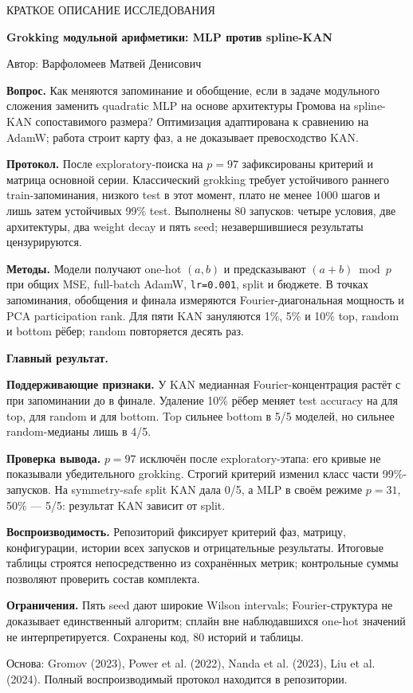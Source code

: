 \documentclass[11pt,a4paper]{article}
\begin{document}
{\color{accent}\small КРАТКОЕ ОПИСАНИЕ ИССЛЕДОВАНИЯ}\par
{\LARGE\bfseries Grokking модульной арифметики: MLP против spline-KAN}\par
{\small Автор: Варфоломеев Матвей Денисович}\par
\vspace{3mm}

\textbf{Вопрос.} Как меняются запоминание и обобщение, если в задаче модульного
сложения заменить quadratic MLP на основе архитектуры Громова на spline-KAN
сопоставимого размера? Оптимизация адаптирована к сравнению на AdamW; работа
строит карту фаз, а не доказывает превосходство KAN.

\textbf{Протокол.} После exploratory-поиска на $p=97$ зафиксированы критерий и
матрица основной серии. Классический grokking требует устойчивого раннего
train-запоминания, низкого test в этот момент, плато не менее 1000 шагов и лишь
затем устойчивых 99\% test. Выполнены 80 запусков: четыре условия,
две архитектуры, два weight decay и пять seed; незавершившиеся результаты
цензурируются.

\textbf{Методы.} Модели получают one-hot $(a,b)$ и предсказывают
$(a+b)\bmod p$ при общих MSE, full-batch AdamW, \texttt{lr=0.001}, split и
бюджете. В точках запоминания, обобщения и финала измеряются
Fourier-диагональная мощность и PCA participation rank. Для пяти KAN зануляются
1\%, 5\% и 10\% top, random и bottom рёбер; random повторяется десять раз.

\textbf{Главный результат.} \MainResultLong

\textbf{Поддерживающие признаки.} У KAN медианная Fourier-концентрация растёт с
\KanFourierMem{} при запоминании до \KanFourierFinal{} в финале. Удаление 10\%
рёбер меняет test accuracy на \TopTenDelta{} для top, \RandomTenDelta{} для
random и \BottomTenDelta{} для bottom. Top сильнее bottom в 5/5 моделей, но
сильнее random-медианы лишь в 4/5.

\textbf{Проверка вывода.} $p=97$ исключён после exploratory-этапа: его
кривые не показывали убедительного grokking. Строгий критерий изменил класс
части 99\%-запусков. На symmetry-safe split KAN дала 0/5, а MLP в своём
режиме $p=31$, 50\% --- 5/5: результат KAN зависит от split.

\textbf{Воспроизводимость.} Репозиторий фиксирует критерий фаз, матрицу,
конфигурации, истории всех запусков и отрицательные результаты. Итоговые таблицы
строятся непосредственно из сохранённых метрик; контрольные суммы позволяют
проверить состав комплекта.

\textbf{Ограничения.} Пять seed дают широкие Wilson intervals;
Fourier-структура не доказывает единственный алгоритм; сплайн вне наблюдавшихся
one-hot значений не интерпретируется. Сохранены код, 80 историй и таблицы.

\vfill
{\small Основа: Gromov (2023), Power et al. (2022), Nanda et al. (2023),
Liu et al. (2024). Полный воспроизводимый протокол находится в репозитории.}
\end{document}
